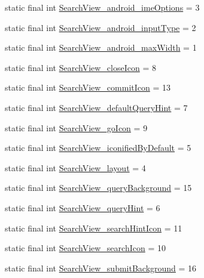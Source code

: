 \begin{DoxyCompactItemize}
static final int \hyperlink{classcheck_1_1test_1_1_r_1_1styleable_ac373b6a41705a4741ee109683c6b18fb}{Search\+View\+\_\+android\+\_\+ime\+Options} = 3
\item 
static final int \hyperlink{classcheck_1_1test_1_1_r_1_1styleable_a94590242dae34b9e05ef2e5e71613cb4}{Search\+View\+\_\+android\+\_\+input\+Type} = 2
\item 
static final int \hyperlink{classcheck_1_1test_1_1_r_1_1styleable_a77f942b17351847bdbed74d6b26c17e2}{Search\+View\+\_\+android\+\_\+max\+Width} = 1
\item 
static final int \hyperlink{classcheck_1_1test_1_1_r_1_1styleable_adda1bbb19f8d55c5be43c305e20f2e18}{Search\+View\+\_\+close\+Icon} = 8
\item 
static final int \hyperlink{classcheck_1_1test_1_1_r_1_1styleable_a31409b8f7f4cf0147ae878cb9dd11c99}{Search\+View\+\_\+commit\+Icon} = 13
\item 
static final int \hyperlink{classcheck_1_1test_1_1_r_1_1styleable_a25fc4426b5d6f7fd9c05b2c7b543a9c7}{Search\+View\+\_\+default\+Query\+Hint} = 7
\item 
static final int \hyperlink{classcheck_1_1test_1_1_r_1_1styleable_aa1834df2b3dd894df7c2d6e194cf864a}{Search\+View\+\_\+go\+Icon} = 9
\item 
static final int \hyperlink{classcheck_1_1test_1_1_r_1_1styleable_aa8cd4a6d1145a57929dc88b7db75616a}{Search\+View\+\_\+iconified\+By\+Default} = 5
\item 
static final int \hyperlink{classcheck_1_1test_1_1_r_1_1styleable_a43de74d589f89c8acfb186f9078f5192}{Search\+View\+\_\+layout} = 4
\item 
static final int \hyperlink{classcheck_1_1test_1_1_r_1_1styleable_ae1dc74a07b7705c97c66e2f4ed17ee37}{Search\+View\+\_\+query\+Background} = 15
\item 
static final int \hyperlink{classcheck_1_1test_1_1_r_1_1styleable_a81a033a05b9ad3bb82d2aa9daa757cfb}{Search\+View\+\_\+query\+Hint} = 6
\item 
static final int \hyperlink{classcheck_1_1test_1_1_r_1_1styleable_ad0538833b27a29b6c19c419c1e948765}{Search\+View\+\_\+search\+Hint\+Icon} = 11
\item 
static final int \hyperlink{classcheck_1_1test_1_1_r_1_1styleable_ab032023905a333c304872772b4b7aa87}{Search\+View\+\_\+search\+Icon} = 10
\item 
static final int \hyperlink{classcheck_1_1test_1_1_r_1_1styleable_a85d86db6e7bedfaa5d09b84a2324b42b}{Search\+View\+\_\+submit\+Background} = 16
\item 

\end{DoxyCompactItemize}
